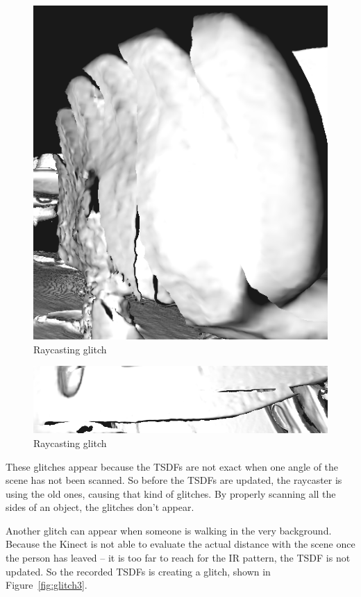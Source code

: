 \documentclass[12pt, twoside]{article}
\begin{document}
\begin{figure}[!h]
  \centering
  \includegraphics[scale=0.3]{glitch1.png}
  \caption{\label{fig:glitch1} Raycasting glitch}
\end{figure}

\begin{figure}[!h]
  \centering
  \includegraphics[scale=0.3]{glitch2.png}
  \caption{\label{fig:glitch2} Raycasting glitch}
\end{figure}

These glitches appear because the TSDFs are not exact when one angle of the scene has not been scanned. So before the TSDFs are updated, the raycaster is using the old ones, causing that kind of glitches. By properly scanning all the sides of an object, the glitches don't appear.

Another glitch can appear when someone is walking in the very background. Because the Kinect is not able to evaluate the actual distance with the scene once the person has leaved -- it is too far to reach for the IR pattern, the TSDF is not updated. So the recorded TSDFs is creating a glitch, shown in Figure~\ref{fig:glitch3}.
\end{document}
